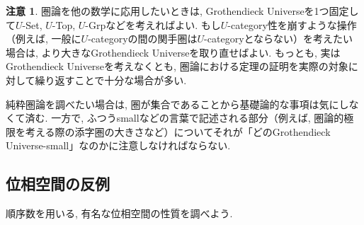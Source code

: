 \documentclass[a4paper, twoside]{bxjsarticle}
\theoremstyle{definition}
\newtheorem{rem}[thm]{注意}
\begin{document}
        \begin{rem}
            圏論を他の数学に応用したいときは, Grothendieck Universeを1つ固定して$U$-Set, $U$-Top, $U$-Grpなどを考えればよい. もし$U$-category性を崩すような操作（例えば, 一般に$U$-categoryの間の関手圏は$U$-categoryとならない）を考えたい場合は, より大きなGrothendieck Universeを取り直せばよい. もっとも, 実はGrothendieck Universeを考えなくとも, 圏論における定理の証明を実際の対象に対して繰り返すことで十分な場合が多い.
            
            純粋圏論を調べたい場合は, 圏が集合であることから基礎論的な事項は気にしなくて済む. 一方で, ふつうsmallなどの言葉で記述される部分（例えば, 圏論的極限を考える際の添字圏の大きさなど）についてそれが「どのGrothendieck Universe-small」なのかに注意しなければならない.
        \end{rem}
    \subsection{位相空間の反例}
        順序数を用いる, 有名な位相空間の性質を調べよう. 
        
\end{document}
